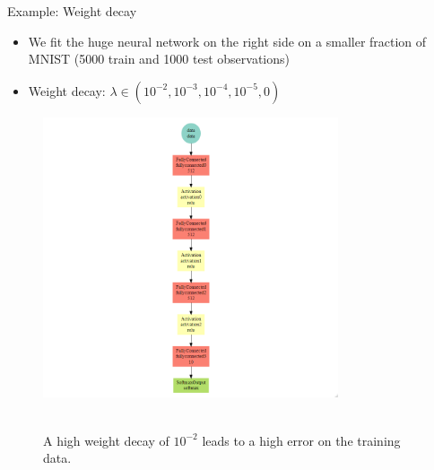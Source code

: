 \begin{vbframe}{Example: Weight decay}
\begin{minipage}{0.45\textwidth}
\begin{itemize}
\item We fit the huge neural network on the right side on a smaller fraction of MNIST (5000 train and 1000 test observations)
\item Weight decay: $\lambda \in (10^{-2}, 10^{-3}, 10^{-4}, 10^{-5}, 0)$
\end{itemize}
\end{minipage}
\begin{minipage}{0.45\textwidth}
\begin{figure}
\centering
\includegraphics[width=8.7cm]{figure/mxnet_graph_decay.png}
\end{figure}
\end{minipage}
\framebreak

\begin{figure}
\centering
{}
\\
A high weight decay of $10^{-2}$ leads to a high error on the training data.
\end{figure}


\end{vbframe}
